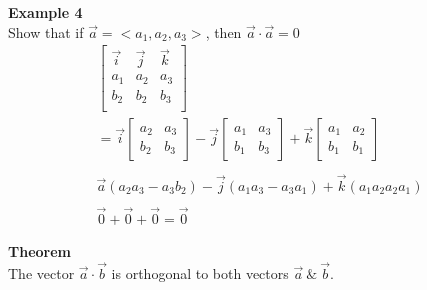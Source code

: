 \documentclass{article}
\begin{document}
  \textbf{Example 4}\\
  Show that if $ \vec{a} = <a_1, a_2, a_3> $, then $ \vec{a} \cdot \vec{a} =0 $
  \[
    \begin{gathered}
    \begin{bmatrix}
      \vec{i} &\vec{j} &\vec{k}\\
      a_{1} &a_{2} &a_{3}\\
      b_{2} &b_{2} &b_{3}\\ 
    \end{bmatrix}\\
    = \vec{ i } \begin{bmatrix}
      a_2 &a_3\\
      b_2 &b_3
    \end{bmatrix} - 
    \vec{ j } \begin{bmatrix}
      a_1 &a_3\\
      b_1 &b_3
    \end{bmatrix} + 
    \vec{ k } \begin{bmatrix}
      a_1 &a_2\\
      b_1 &b_1
    \end{bmatrix}\\
    ~\\
    \vec{a}(a_{2} a_{3} -a_{3} b_{2} )-\vec{j}(a_{1} a_{3} -a_{3} a_{1} )+ \vec{k}(a_{1} a_{2} a_{2} a_{1} )\\
    ~\\
    \vec{0}+\vec{0}+\vec{0}=\boxed{\vec{0}} 
    \end{gathered}
  \] 
  

  \textbf{Theorem}\\
  The vector $ \vec{ a } \cdot \vec{ b } $ is orthogonal to both vectors $ \vec{ a } ~ \&~ \vec{ b }   $. 
\end{document}
